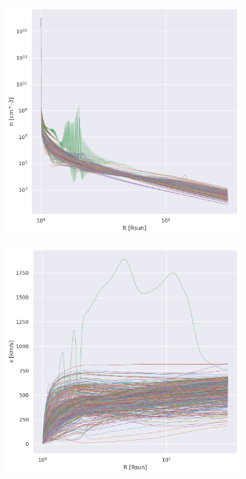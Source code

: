 \begin{figure}[!ht]
     \centering
     \begin{subfigure}[b]{0.32\textwidth}
         \centering
         \includegraphics[width=\textwidth]{figures/volume_radius.png}
     \end{subfigure}
     \hfill
     \begin{subfigure}[b]{0.32\textwidth}
         \centering
         \includegraphics[width=\textwidth]{figures/velocity_radius.png}

\end{subfigure}
\end{figure}
